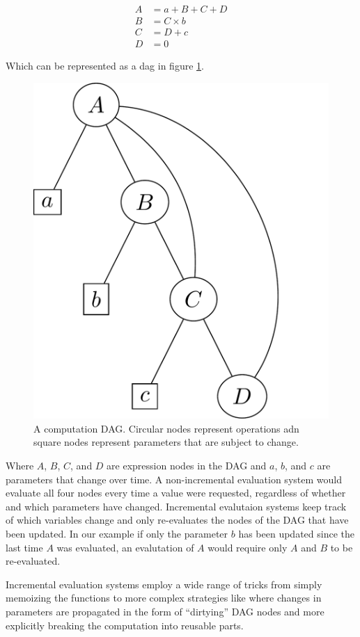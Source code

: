 \begin{align*}
A &= a + B + C + D  \\
B &= C \times b \\
C & = D + c \\
D &= 0
\end{align*}

Which can be represented as a dag in figure
\ref{fig:example_antisthenis_dag}.

\begin{figure}[H]
\centering
\includegraphics[width=.5\textwidth]{./imgs/example_antisthenis_dag.pdf}
\caption{\label{fig:example_antisthenis_dag}A computation
  DAG. Circular nodes represent operations adn square nodes represent
  parameters that are subject to change.}
\end{figure}

Where \(A\), \(B\), \(C\), and \(D\) are expression nodes in the DAG
and \(a\), \(b\), and \(c\) are parameters that change over time. A
non-incremental evaluation system would evaluate all four nodes every
time a value were requested, regardless of whether and which
parameters have changed. Incremental evalutaion systems keep track of
which variables change and only re-evaluates the nodes of the DAG that
have been updated. In our example if only the parameter \(b\) has been
updated since the last time \(A\) was evaluated, an evalutation of
\(A\) would require only \(A\) and \(B\) to be re-evaluated.

Incremental evaluation systems employ a wide range of tricks from
simply memoizing the functions
\cite{pughIncrementalComputationFunction1989} to more complex
strategies like \cite{hammerAdaptonComposableDemanddriven2014a} where
changes in parameters are propagated in the form of ``dirtying'' DAG
nodes and more explicitly breaking the computation into reusable
parts.

